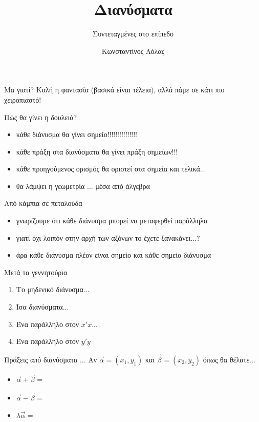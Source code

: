 \documentclass{presentation}
\title{Διανύσματα}
\subtitle{Συντεταγμένες στο επίπεδο}
\author[Λόλας]{Κωνσταντίνος Λόλας}
\date{}
\begin{document}
\begin{frame}
  \titlepage
\end{frame}
\begin{frame}{Μα γιατί?}
  Καλή η φαντασία (βασικά είναι τέλεια), αλλά πάμε σε κάτι πιο χειροπιαστό!
\end{frame}

\begin{frame}{Πώς θα γίνει η δουλειά?}
  \begin{itemize}
    \item<1-> κάθε διάνυσμα θα γίνει σημείο!!!!!!!!!!!!!!!
    \item<2-> κάθε πράξη στα διανύσματα θα γίνει πράξη σημείων!!!
    \item<3-> κάθε προηγούμενος ορισμός θα οριστεί στα σημεία και τελικά...
    \item<4-> θα λάμψει η γεωμετρία ...  {μέσα από άλγεβρα}
  \end{itemize}
\end{frame}

\begin{frame}{Από κάμπια σε πεταλούδα}
  \begin{itemize}
    \item<1-> γνωρίζουμε ότι κάθε διάνυσμα μπορεί να μεταφερθεί παράλληλα
    \item<2-> γιατί όχι λοιπόν στην αρχή των αξόνων
           {το έχετε ξανακάνει...?}
    \item<4-> άρα κάθε διάνυσμα πλέον είναι σημείο και κάθε σημείο διάνυσμα
  \end{itemize}
\end{frame}

\begin{frame}{Μετά τα γεννητούρια}
  \begin{enumerate}
    \item<1-> Το μηδενικό διάνυσμα...
    \item<2-> Ίσα διανύσματα...
    \item<3-> Ένα παράλληλο στον $x'x$...
    \item<4-> Ένα παράλληλο στον $y'y$
  \end{enumerate}
\end{frame}

\begin{frame}{Πράξεις από διανύσματα ...}
  Αν $\vec{α}=(x_1,y_1)$ και $\vec{β}=(x_2,y_2)$ όπως θα θέλατε...
  \begin{itemize}
    \item<1-> $\vec{α}+\vec{β}=$ 
    \item<2->  $\vec{α}-\vec{β}=$ 
    \item<3->  $λ\vec{α}=$ 
  \end{itemize}
\end{frame}
\end{document}
